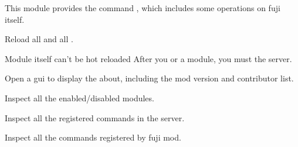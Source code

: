 \label{ch:fuji}

This module provides the command , which includes some operations on fuji itself.

Reload all  and all .

\begin{note}{Module itself can't be hot reloaded}
    After you  or  a module, you must  the server.
\end{note}

Open a gui to display the about, including the mod version and contributor list.

Inspect all the enabled/disabled modules.

Inspect all the registered commands in the server.

Inspect all the commands registered by fuji mod.



